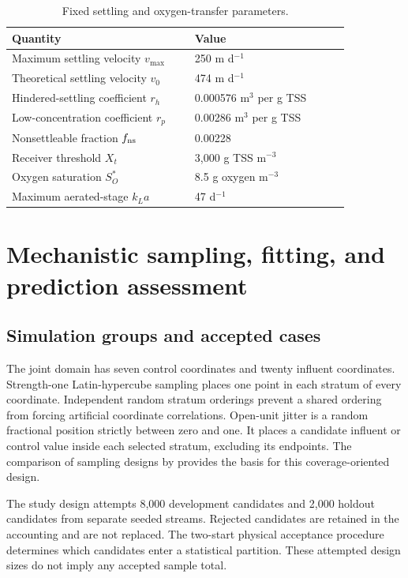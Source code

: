 \begin{table}[htbp]
\centering\small
\caption{Fixed settling and oxygen-transfer parameters.}
\label{tab:plant_settling_constants}
\begin{tabular}{p{0.46\linewidth}p{0.39\linewidth}}
\toprule Quantity & Value\\\midrule
Maximum settling velocity $v_{\max}$ & 250 m d$^{-1}$\\
Theoretical settling velocity $v_0$ & 474 m d$^{-1}$\\
Hindered-settling coefficient $r_h$ & 0.000576 m$^3$ per g TSS\\
Low-concentration coefficient $r_p$ & 0.00286 m$^3$ per g TSS\\
Nonsettleable fraction $f_{\rm ns}$ & 0.00228\\
Receiver threshold $X_t$ & 3{,}000 g TSS m$^{-3}$\\
Oxygen saturation $S_O^*$ & 8.5 g oxygen m$^{-3}$\\
Maximum aerated-stage $k_La$ & 47 d$^{-1}$\\
\bottomrule
\end{tabular}
\end{table}

\section{Mechanistic sampling, fitting, and prediction assessment}

\subsection{Simulation groups and accepted cases}

The joint domain has seven control coordinates and twenty influent coordinates. Strength-one Latin-hypercube sampling places one point in each stratum of every coordinate. Independent random stratum orderings prevent a shared ordering from forcing artificial coordinate correlations. Open-unit jitter is a random fractional position strictly between zero and one. It places a candidate influent or control value inside each selected stratum, excluding its endpoints. The comparison of sampling designs by \citet{McKay1979} provides the basis for this coverage-oriented design.

The study design attempts 8{,}000 development candidates and 2{,}000 holdout candidates from separate seeded streams. Rejected candidates are retained in the accounting and are not replaced. The two-start physical acceptance procedure determines which candidates enter a statistical partition. These attempted design sizes do not imply any accepted sample total.

